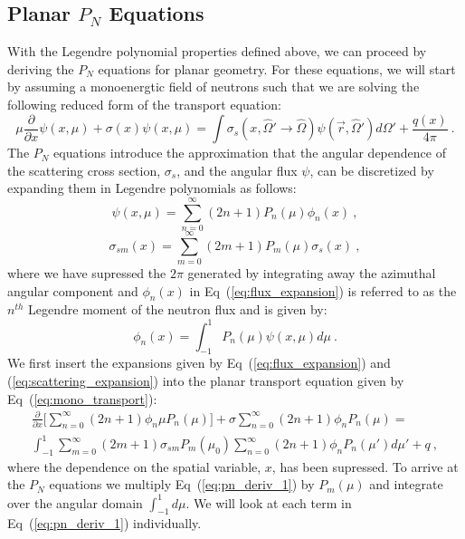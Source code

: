 \subsection{Planar $P_N$ Equations}
\label{subsec:planar_pn}
With the Legendre polynomial properties defined above, we can proceed
by deriving the $P_N$ equations for planar geometry. For these
equations, we will start by assuming a monoenergtic field of neutrons
such that we are solving the following reduced form of the transport
equation: 
\begin{equation}
  \mu \frac{\partial}{\partial x} \psi(x,\mu) + \sigma(x) \psi(x,\mu)
  = \int \sigma_s(x,\hat{\Omega}' \rightarrow \hat{\Omega})
  \psi(\vec{r},\hat{\Omega}') d\Omega' + \frac{q(x)}{4 \pi}\:.
  \label{eq:mono_transport}
\end{equation}
The $P_N$ equations introduce the approximation that the angular
dependence of the scattering cross section, $\sigma_s$, and the angular
flux $\psi$, can be discretized by expanding them in Legendre
polynomials as follows:
\begin{equation}
  \psi(x,\mu) = \sum_{n=0}^\infty (2n+1)P_n(\mu)\phi_n(x)\:,
  \label{eq:flux_expansion}
\end{equation}
\begin{equation}
  \sigma_{sm}(x) = \sum_{m=0}^\infty (2m+1)P_m(\mu)\sigma_s(x)\:,
  \label{eq:scattering_expansion}
\end{equation}
where we have supressed the $2\pi$ generated by integrating away the
azimuthal angular component and $\phi_n(x)$ in
Eq~(\ref{eq:flux_expansion}) is referred to as the $n^{th}$ Legendre
moment of the neutron flux and is given by:
\begin{equation}
  \phi_n(x) = \int_{-1}^1 P_n(\mu)\psi(x,\mu)d\mu\:.
  \label{eq:legendre_moments}
\end{equation}
We first insert the expansions given by Eq~(\ref{eq:flux_expansion})
and (\ref{eq:scattering_expansion}) into the planar transport equation
given by Eq~(\ref{eq:mono_transport}):
\begin{multline}
  \frac{\partial}{\partial x}\Big[\sum_{n=0}^\infty (2n+1) \phi_n \mu
    P_n(\mu) \Big] + \sigma \sum_{n=0}^\infty (2n+1) \phi_n P_n(\mu) =
  \\ \int_{-1}^1 \sum_{m=0}^\infty (2m+1) \sigma_{sm} P_m(\mu_0)
  \sum_{n=0}^\infty (2n+1) \phi_n P_n(\mu') d \mu' + q\:,
  \label{eq:pn_deriv_1}
\end{multline}
where the dependence on the spatial variable, $x$, has been
supressed. To arrive at the $P_N$ equations we multiply
Eq~(\ref{eq:pn_deriv_1}) by $P_m(\mu)$ and integrate over the angular
domain $\int_{-1}^1 d \mu$. We will look at each term in
Eq~(\ref{eq:pn_deriv_1}) individually.

